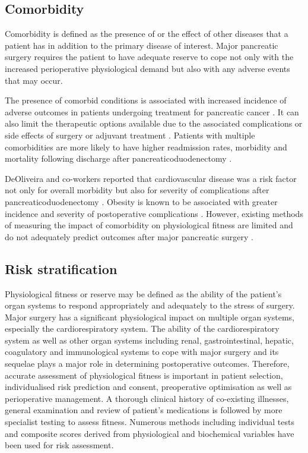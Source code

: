 \subsection{Comorbidity}
Comorbidity is defined as the presence of or the effect of other diseases that a patient has in addition to the primary disease of interest. 
Major pancreatic surgery requires the patient to have adequate reserve to cope not only with the increased perioperative physiological demand but also with any adverse events that may occur.

The presence of comorbid conditions is associated with increased incidence of adverse outcomes in patients undergoing treatment for pancreatic cancer \parencite{mann_review_2010}. 
It can also limit the therapeutic options available due to the associated complications or side effects of surgery or adjuvant treatment \parencite{sandroussi_sociodemographics_2010}. 
Patients with multiple comorbidities are more likely to have higher readmission rates, morbidity and mortality following discharge after pancreaticoduodenectomy \parencite{teh_patient_2009}. 

DeOliveira and co-workers reported that cardiovascular disease was a risk factor not only for overall morbidity but also for severity of complications after pancreaticoduodenectomy \parencite{deoliveira_assessment_2006}. 
Obesity is known to be associated with greater incidence and severity of postoperative complications \parencite{benns_impact_2009}. 
However, existing methods of measuring the impact of comorbidity on physiological fitness are limited and do not adequately predict outcomes after major pancreatic surgery \parencite{de_castro_evaluation_2009}. 

\subsection{Risk stratification}
Physiological fitness or reserve may be defined as the ability of the patient's organ systems to respond appropriately and adequately to the stress of surgery. 
Major surgery has a significant physiological impact on multiple organ systems, especially the cardiorespiratory system. 
The ability of the cardiorespiratory system as well as other organ systems including renal, gastrointestinal, hepatic, coagulatory and immunological systems to cope with major surgery and its sequelae plays a major role in determining postoperative outcomes. 
Therefore, accurate assessment of physiological fitness is important in patient selection, individualised risk prediction and consent, preoperative optimisation as well as perioperative management. 
A thorough clinical history of co-existing illnesses, general examination and review of patient's medications is followed by more specialist testing to assess fitness. 
Numerous methods including individual tests and composite scores derived from physiological and biochemical variables have been used for risk assessment.

